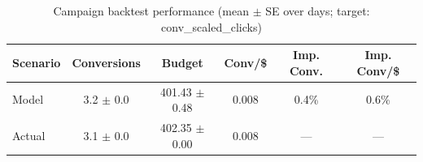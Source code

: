 \begin{table}[htbp]
\centering
\caption{Campaign backtest performance (mean $\pm$ SE over days; target: conv_scaled_clicks)}
\begin{tabular}{lccccc}
\toprule
Scenario & Conversions & Budget & Conv/\$ & Imp. Conv. & Imp. Conv/\$ \\
\midrule
Model & 3.2 $\pm$ 0.0 & 401.43 $\pm$ 0.48 & 0.008 & 0.4\% & 0.6\% \\
Actual & 3.1 $\pm$ 0.0 & 402.35 $\pm$ 0.00 & 0.008 & --- & --- \\
\bottomrule
\end{tabular}

\end{table}
